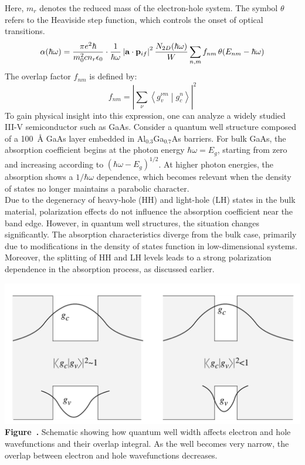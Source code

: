 Here, \( m_r \) denotes the reduced mass of the electron-hole system. The symbol \( \theta \) refers to the Heaviside step function, which controls the onset of optical transitions.
\begin{equation}
	\alpha(\hbar \omega) = \frac{\pi e^2 \hbar}{m_0^2 c n_r \epsilon_0} \cdot \frac{1}{\hbar \omega} \left| \vb{a} \cdot \vb{p}_{if} \right|^2 \frac{N_{2D}(\hbar \omega)}{W} \sum_{n,m} f_{nm} \, \theta(E_{nm} - \hbar \omega)
\end{equation}
The overlap factor \( f_{nm} \) is defined by:
\begin{equation}
	f_{nm} = \left| \sum_\nu \left\langle g_v^{\nu m} \middle| g_c^n \right\rangle \right|^2
\end{equation}
To gain physical insight into this expression, one can analyze a widely studied III-V semiconductor such as GaAs. Consider a quantum well structure composed of a 100~\AA{} GaAs layer embedded in Al$_{0.3}$Ga$_{0.7}$As barriers. For bulk GaAs, the absorption coefficient begins at the photon energy \( \hbar \omega = E_g \), starting from zero and increasing according to \( (\hbar \omega - E_g)^{1/2} \). At higher photon energies, the absorption shows a \( 1 / \hbar \omega \) dependence, which becomes relevant when the density of states no longer maintains a parabolic character.\\
Due to the degeneracy of heavy-hole (HH) and light-hole (LH) states in the bulk material, polarization effects do not influence the absorption coefficient near the band edge. However, in quantum well structures, the situation changes significantly. The absorption characteristics diverge from the bulk case, primarily due to modifications in the density of states function in low-dimensional systems. Moreover, the splitting of HH and LH levels leads to a strong polarization dependence in the absorption process, as discussed earlier.
\begin{center}
	\begin{minipage}{0.6\textwidth}
		\centering
		\includegraphics[width=\textwidth]{img/well_size.png}
		\\[0.5em]
		\textbf{Figure~\thefigure.} Schematic showing how quantum well width affects electron and hole wavefunctions and their overlap integral. As the well becomes very narrow, the overlap between electron and hole wavefunctions decreases.
		\label{fig:well_size}
	\end{minipage}
\end{center}
